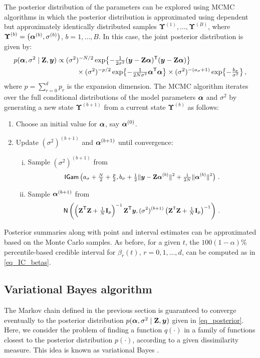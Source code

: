 \documentclass[letterpaper,10pt,openany]{article}
\def\exp#1{{\rm exp}{#1}}
\newcommand{\ex}[1]{\exp{ \left\{ #1 \right\}}}
\def\I{\mathbf{I}}\def\i{\mathbf{i}}\def\Iv{\boldsymbol{I}}\def\iv{\boldsymbol{i}}
\def\Z{\mathbf{Z}}\def\z{\mathbf{z}}\def\Zv{\boldsymbol{Z}}\def\zv{\boldsymbol{z}}
\def\be{\beta}\def\bev{\boldsymbol{\beta}}
\def\sig{\sigma}\def\sigv{\boldsymbol{\sigma}}
\def\Upsv{\boldsymbol{\Upsilon}}
\def\Nor{\small{\mathsf{N}}}
\def\IGamd{\small{\mathsf{IGam}}}
\def\trans{\text{\textsf{T}}}
\begin{document}
The posterior distribution of the parameters can be explored using MCMC algorithms in which the posterior distribution is approximated using dependent but approximately identically distributed samples $\Upsv^{(1)},\ldots,\Upsv^{(B)}$, where $\Upsv^{(b)} = \left( \alv^{(b)},\sig^{(b)} \right)$, $b = 1,\ldots,B$. 
In this case, the joint posterior distribution is given by:
\begin{align}
p(\alv,\sig^2\mid\Z,\yv) 
&\propto (\sig^2)^{-N/2}\,\ex{-\tfrac{1}{2\sig^2}(\yv-\Z\alv)^\trans(\yv-\Z\alv)} \nonumber \\
&\hspace{1cm} \times (\sig^2)^{-p/2}\,\ex{-\tfrac{1}{2N\sig^2}\alv^\trans\alv}
\times (\sig^2)^{-(a_\sig + 1)}\,\ex{-\tfrac{b_\sig}{\sig^2}}\,,  \label{eq_posterior}
\end{align}
where $p=\sum_{r=0}^d p_r$ is the expansion dimension. The MCMC algorithm iterates over the full conditional distributions of the model parameters $\boldsymbol{\alpha}$ and $\sig^2$ by generating a new state $\Upsv^{(b+1)}$ from a current state $\Upsv^{(b)}$ as follows:
\begin{enumerate}
	\item Choose an initial value for $\boldsymbol{\alpha}$, say $\boldsymbol{\alpha}^{(0)}$.
	\item Update $(\sig^2)^{(b+1)}$ and $\boldsymbol{\alpha}^{(b+1)}$ until convergence:
	\begin{enumerate}[i.]
		\item Sample $(\sig^2)^{(b+1)}$ from
		$$
		\IGamd\left(a_\sig + \tfrac{N}{2} + \tfrac{p}{2} , b_\sig + \tfrac12\|\yv-\Z\alv^{(b)}\|^2 + \tfrac{1}{2N}\|\alv^{(b)}\|^2\right)\,.
		$$
		\item Sample $\boldsymbol{\alpha}^{(b+1)}$ from
		$$
		\Nor\left( \left(\Z^\trans\Z + \tfrac{1}{N}\I_p\right)^{-1} \Z^\trans\yv , (\sig^2)^{(b+1)}\left(\Z^\trans\Z + \tfrac{1}{N}\I_p\right)^{-1} \right)\,.
		$$
	\end{enumerate}
\end{enumerate}
Posterior summaries along with point and interval estimates can be approximated based on the Monte Carlo samples. As before, for a given $t$, the $100(1-\alpha)\%$ percentile-based credible interval for $\be_r(t)$, $r=0,1,\ldots,d$, can be computed as in \eqref{eq_IC_betas}.


\subsection{Variational Bayes algorithm}\label{app_variational} 


The Markov chain defined in the previous section is guaranteed to converge eventually to the posterior distribution $p(\alv,\sig^2\mid\Z,\yv)$ given in \eqref{eq_posterior}. Here, we consider the problem of finding a function $q(\cdot)$ in a family of functions closest to the posterior distribution $p(\cdot)$, according to a given dissimilarity measure. This idea is known as variational Bayes \citep[see][for a review]{ormerod-2010-explaining}.
\end{document}
